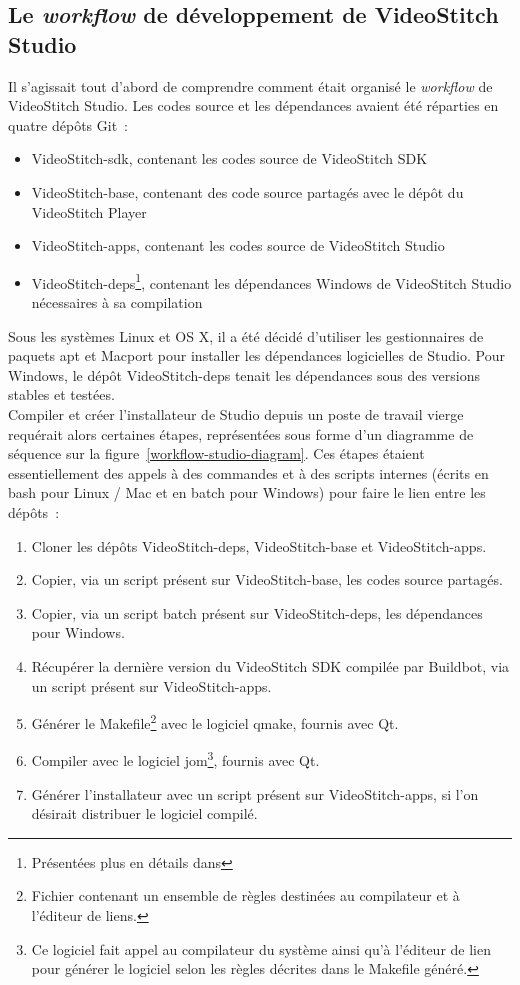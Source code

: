 \subsection{Le \textit{workflow} de développement de VideoStitch Studio}
\label{workflow-studio}
Il s'agissait tout d'abord de comprendre comment était organisé le \textit{workflow} 
de VideoStitch Studio.
Les codes source et les dépendances avaient été réparties en quatre dépôts Git~: 
\begin{itemize}
  \item VideoStitch-sdk, contenant les codes source de VideoStitch SDK
  \item VideoStitch-base, contenant des code source partagés avec le dépôt du VideoStitch Player
  \item VideoStitch-apps, contenant les codes source de VideoStitch Studio
  \item VideoStitch-deps\footnote{Présentées plus en détails dans }, 
  contenant les dépendances Windows de VideoStitch Studio 
  nécessaires à sa compilation
\end{itemize}
Sous les systèmes Linux et OS X, il a été décidé d'utiliser les gestionnaires
de paquets apt et Macport pour installer les dépendances logicielles de Studio. Pour
Windows, le dépôt VideoStitch-deps tenait les dépendances sous des versions stables et testées.\\
\newline
Compiler et créer l'installateur de Studio depuis un poste de travail vierge requérait alors
certaines étapes, représentées sous forme d'un diagramme de séquence sur la figure~\ref{workflow-studio-diagram}.
Ces étapes étaient essentiellement des appels à des commandes et à des scripts internes
(écrits en bash pour Linux / Mac et en batch pour Windows) pour faire le lien entre les dépôts~:
\begin{enumerate}
  \item Cloner les dépôts VideoStitch-deps, VideoStitch-base et VideoStitch-apps.
  \item Copier, via un script présent sur VideoStitch-base, les codes source partagés.
  \item Copier, via un script batch présent sur VideoStitch-deps, les dépendances pour Windows.
  \item Récupérer la dernière version du VideoStitch SDK compilée par Buildbot, 
  via un script présent sur VideoStitch-apps.
  \item Générer le Makefile\footnote{Fichier contenant un ensemble de règles destinées
  au compilateur et à l'éditeur de liens.} avec le logiciel qmake, fournis avec Qt.
  \item Compiler avec le logiciel jom\footnote{Ce logiciel fait appel au compilateur 
  du système ainsi qu'à l'éditeur de lien pour générer le logiciel selon les règles
  décrites dans le Makefile généré.}, fournis avec Qt.
  \item Générer l'installateur avec un script présent sur VideoStitch-apps, si
  l'on désirait distribuer le logiciel compilé.
\end{enumerate}
